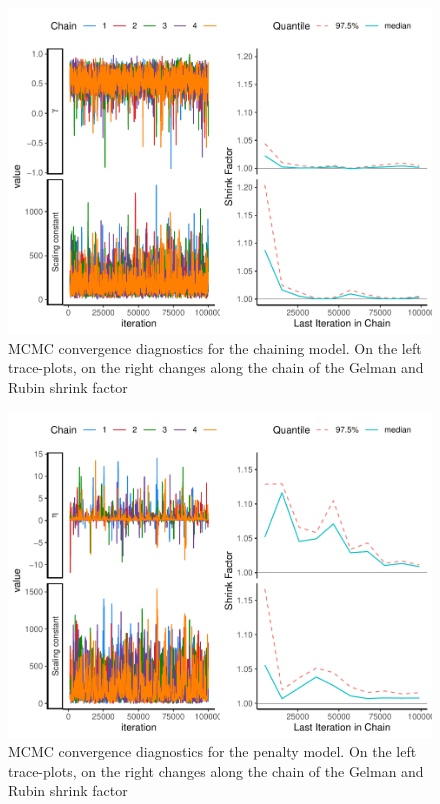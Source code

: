 \documentclass[10pt,letterpaper]{article}
\begin{document}
\begin{figure}
\includegraphics[width=1\linewidth]{manuscript_PLOS_files/figure-latex/diaggam-1} \caption{MCMC convergence diagnostics for the chaining model. On the left trace-plots, on the right changes along the chain of the Gelman and Rubin shrink factor }\label{fig:diaggam}
\end{figure}

\begin{figure}
\includegraphics[width=1\linewidth]{manuscript_PLOS_files/figure-latex/diagNeg-1} \caption{MCMC convergence diagnostics for the penalty model. On the left trace-plots, on the right changes along the chain of the Gelman and Rubin shrink factor}\label{fig:diagNeg}
\end{figure}
\end{document}
